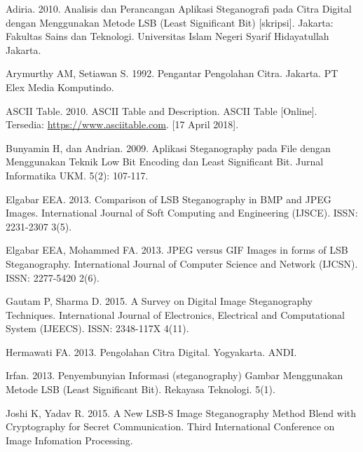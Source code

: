 \documentclass{jtetiskripsi}
\begin{document}
%
\begin{thebibliography}{99}
	 Adiria. 2010. Analisis dan Perancangan Aplikasi Steganografi pada Citra Digital dengan Menggunakan Metode LSB (Least Significant Bit) [skripsi]. Jakarta: Fakultas Sains dan Teknologi. Universitas Islam Negeri Syarif Hidayatullah Jakarta.
	
	 Arymurthy AM, Setiawan S. 1992. Pengantar Pengolahan Citra. Jakarta. PT Elex Media Komputindo.
	
	 ASCII Table.  2010. ASCII Table and Description.  ASCII Table [Online]. Tersedia: \url{https://www.asciitable.com}. [17 April 2018].
	
	 Bunyamin H, dan Andrian. 2009. Aplikasi Steganography pada File dengan Menggunakan Teknik Low Bit Encoding dan Least Significant Bit. Jurnal Informatika UKM. 5(2): 107-117.
	
	 Elgabar EEA. 2013. Comparison of LSB Steganography in BMP and JPEG Images. International Journal of Soft Computing and Engineering (IJSCE). ISSN: 2231-2307 3(5).
	
	 Elgabar EEA, Mohammed FA. 2013. JPEG versus GIF Images in forms of LSB Steganography.  International Journal of Computer Science and Network (IJCSN). ISSN: 2277-5420 2(6).
	
	 Gautam P, Sharma D. 2015. A Survey on Digital Image Steganography Techniques. International Journal of Electronics, Electrical and Computational System (IJEECS). ISSN: 2348-117X 4(11). 
	
	 Hermawati FA. 2013. Pengolahan Citra Digital. Yogyakarta. ANDI.
	
	 Irfan. 2013. Penyembunyian Informasi (steganography) Gambar Menggunakan Metode LSB (Least Significant Bit). Rekayasa Teknologi. 5(1).
	
	 Joshi K, Yadav R. 2015. A New LSB-S Image Steganography Method Blend with Cryptography for Secret Communication. Third International Conference on Image Infomation Processing.
	

\end{thebibliography}
\end{document}
